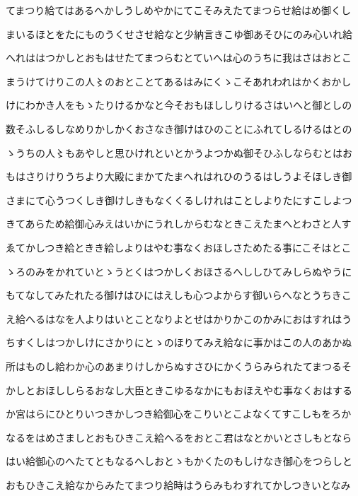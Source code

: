 \documentclass[a4paper,11pt,landscape]{ltjtarticle}
\begin{document}
てまつり給てはあるへかしうしめやかにてこそみえたてまつらせ給はめ御くし
\par\medskip
まいるほとをたにものうくせさせ給なと少納言きこゆ御あそひにのみ心いれ給
\par\medskip
へれははつかしとおもはせたてまつらむとていへは心のうちに我はさはおとこ
\par\medskip
まうけてけりこの人〻のおとことてあるはみにくゝこそあれわれはかくおかし
\par\medskip
けにわかき人をもゝたりけるかなと今そおもほししりけるさはいへと御としの
\par\medskip
数そふしるしなめりかしかくおさなき御けはひのことにふれてしるけるはとの
\par\medskip
ゝうちの人〻もあやしと思ひけれといとかうよつかぬ御そひふしならむとはお
\par\medskip
もはさりけりうちより大殿にまかてたまへれはれひのうるはしうよそほしき御
\par\medskip
さまにて心うつくしき御けしきもなくくるしけれはことしよりたにすこしよつ
\par\medskip
きてあらため給御心みえはいかにうれしからむなときこえたまへとわさと人す
\par\medskip
ゑてかしつき給ときき給しよりはやむ事なくおほしさためたる事にこそはとこ
\par\medskip
ゝろのみをかれていとゝうとくはつかしくおほさるへししひてみしらぬやうに
\par\medskip
もてなしてみたれたる御けはひにはえしも心つよからす御いらへなとうちきこ
\par\medskip
え給へるはなを人よりはいとことなりよとせはかりかこのかみにおはすれはう
\par\medskip
ちすくしはつかしけにさかりにとゝのほりてみえ給なに事かはこの人のあかぬ
\par\medskip
所はものし給わか心のあまりけしからぬすさひにかくうらみられたてまつるそ
\par\medskip
かしとおほししらるおなし大臣ときこゆるなかにもおほえやむ事なくおはする
\par\medskip
か宮はらにひとりいつきかしつき給御心をこりいとこよなくてすこしもをろか
\par\medskip
なるをはめさましとおもひきこえ給へるをおとこ君はなとかいとさしもとなら
\par\medskip
はい給御心のへたてともなるへしおとゝもかくたのもしけなき御心をつらしと
\par\medskip
おもひきこえ給なからみたてまつり給時はうらみもわすれてかしつきいとなみ
\par\medskip
\end{document}
